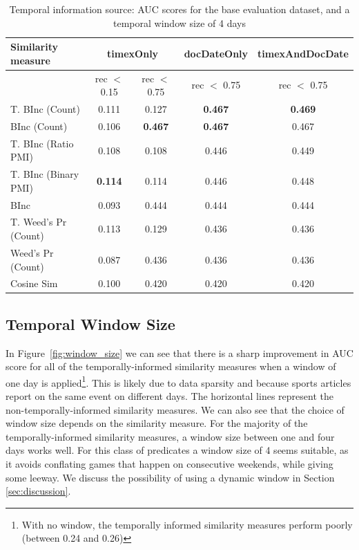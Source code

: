 \documentclass[11pt]{article}
\begin{document}
\begin{table}[]
\centering
\small
\begin{tabular}{lcccc}
\toprule
\textbf{Similarity measure}                            & \multicolumn{2}{c}{\textbf{timexOnly}} & \textbf{docDateOnly} & \textbf{timexAndDocDate} \\ \midrule
                   & rec $<$ 0.15               & rec $<$ 0.75               & rec $<$ 0.75                 & rec $<$ 0.75                     \\ 
\midrule
T. BInc (Count)             & 0.111              & 0.127              & \textbf{0.467}       & \textbf{0.469}           \\ 
BInc (Count)                & 0.106              & \textbf{0.467}     & \textbf{0.467}       & 0.467                    \\ 
T. BInc (Ratio PMI)         & 0.108              & 0.108              & 0.446                & 0.449                    \\ 
T. BInc (Binary PMI)        & \textbf{0.114}     & 0.114              & 0.446                & 0.448                    \\
BInc                        & 0.093              & 0.444              & 0.444                & 0.444                    \\
T. Weed's Pr (Count)         & 0.113              & 0.129              & 0.436                & 0.436                    \\
Weed's Pr (Count)            & 0.087              & 0.436              & 0.436                & 0.436                    \\
Cosine Sim                  & 0.100              & 0.420              & 0.420                & 0.420  \\   \bottomrule
\end{tabular}
\caption{Temporal information source: AUC scores for the base evaluation dataset, and a temporal window size of 4 days}
\label{tab:time_source}
\end{table}


\subsection{Temporal Window Size}
\label{sec:results_timewindow}
In Figure~\ref{fig:window_size} we can see that there is a sharp improvement in AUC score for all of the temporally-informed similarity measures when a window of one day is applied\footnote{With no window, the temporally informed similarity measures perform poorly (between 0.24 and 0.26)}. This is likely due to data sparsity and because sports articles report on the same event on different days. The horizontal lines represent the non-temporally-informed similarity measures. We can also see that the choice of window size depends on the similarity measure. For the majority of the temporally-informed similarity measures, a window size between one and four days works well. For this class of predicates a window size of 4 seems suitable, as it avoids conflating games that happen on consecutive weekends, while giving some leeway. We discuss the possibility of using a dynamic window in Section \ref{sec:discussion}.
\end{document}
